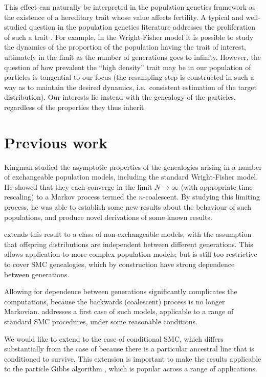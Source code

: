 \documentclass{article}
\begin{document}
This effect can naturally be interpreted in the population genetics framework as the existence of a hereditary trait whose value affects fertility. A typical and well-studied question in the population genetics literature addresses the proliferation of such a trait \citep[Chapter 3]{wakeley2009}. For example, in the Wright-Fisher model it is possible to study the dynamics of the proportion of the population having the trait of interest, ultimately in the limit as the number of generations goes to infinity. However, the question of how prevalent the ``high density'' trait may be in our population of particles is tangential to our focus (the resampling step is constructed in such a way as to maintain the desired dynamics, i.e.\ consistent estimation of the target distribution). Our interests lie instead with the genealogy of the particles, regardless of the properties they thus inherit.


\section{Previous work}
Kingman \citep{kingman1982gene, kingman1982coal, kingman1982exch} studied the asymptotic properties of the genealogies arising in a number of exchangeable population models, including the standard Wright-Fisher model. He showed that they each converge in the limit $N\to\infty$ (with appropriate time rescaling) to a Markov process termed the $n$-coalescent. By studying this limiting process, he was able to establish some new results about the behaviour of such populations, and produce novel derivations of some known results.

\citet{mohle1998} extends this result to a class of non-exchangeable models, with the assumption that offspring distributions are independent between different generations. This allows application to more complex population models; but is still too restrictive to cover SMC genealogies, which by construction have strong dependence between generations.

Allowing for dependence between generations significantly complicates the computations, because the backwards (coalescent) process is no longer Markovian. \citet{koskela2018} addresses a first case of such models, applicable to a range of standard SMC procedures, under some reasonable conditions.

We would like to extend to the case of conditional SMC, which differs substantially from the case of \citet{koskela2018} because there is a particular ancestral line that is conditioned to survive. This extension is important to make the results applicable to the particle Gibbs algorithm \citep{andrieu2010}, which is popular across a range of applications.
\end{document}
